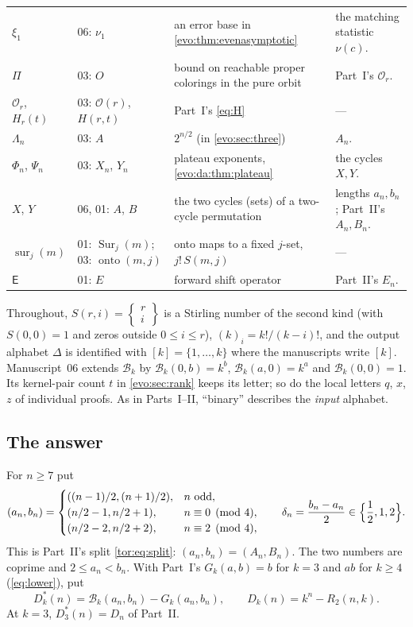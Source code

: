 \documentclass[11pt,a4paper]{article}
\numberwithin{equation}{section}
\theoremstyle{definition}
\theoremstyle{remark}
\newcommand{\D}{\Delta}
\newcommand{\fall}[2]{(#1)_{#2}}
\newcommand{\stirling}[2]{\left\{\!\begin{matrix}#1\\#2\end{matrix}\!\right\}}
\newcommand{\Bip}{\mathcal B}
\newcommand{\sur}{\operatorname{sur}}
\begin{document}
{\begin{longtable}{>{\raggedright}p{.15\linewidth}>{\raggedright}p{.22\linewidth}>{\raggedright}p{.23\linewidth}>{\raggedright\arraybackslash}p{.26\linewidth}}
$\xi_1$ & 06: $\nu_1$ & an error base in \cref{evo:thm:evenasymptotic} & the
 matching statistic $\nu(c)$.\\
$\Pi$ & 03: $O$ & bound on reachable proper colorings in the pure orbit &
 Part~I's $\mathcal O_r$.\\
$\mathcal O_r$, $H_r(t)$ & 03: $\mathcal O(r)$, $H(r,t)$ & Part~I's
 \eqref{eq:H} & ---\\
$\Lambda_n$ & 03: $A$ & $2^{n/2}$ (in \cref{evo:sec:three}) & $A_n$.\\
$\Phi_n$, $\Psi_n$ & 03: $X_n$, $Y_n$ & plateau exponents,
 \cref{evo:da:thm:plateau} & the cycles $X,Y$.\\
$X$, $Y$ & 06, 01: $A$, $B$ & the two cycles (sets) of a two-cycle permutation &
 lengths $a_n,b_n$; Part~II's $A_n,B_n$.\\
$\sur_j(m)$ & 01: $\operatorname{Sur}_j(m)$; 03: $\operatorname{onto}(m,j)$
 & onto maps to a fixed $j$-set, $j!\,S(m,j)$ & ---\\
$\mathsf E$ & 01: $E$ & forward shift operator & Part~II's $E_n$.\\
\end{longtable}}

Throughout, $S(r,i)=\stirling{r}{i}$ is a Stirling number of the second kind
(with $S(0,0)=1$ and zeros outside $0\le i\le r$), $\fall{k}{i}=k!/(k-i)!$, and
the output alphabet $\D$ is identified with $[k]=\{1,\ldots,k\}$ where the
manuscripts write $[k]$. Manuscript~06 extends $\Bip_k$ by
$\Bip_k(0,b)=k^b$, $\Bip_k(a,0)=k^a$ and $\Bip_k(0,0)=1$. Its kernel-pair count
$t$ in \cref{evo:sec:rank} keeps its letter; so do the local letters $q$, $x$,
$z$ of individual proofs. As in Parts~I--II, ``binary'' describes the
\emph{input} alphabet.

\subsection{The answer}\label{evo:sec:answer}

For $n\ge7$ put
\begin{equation}\label{evo:eq:split}
 (a_n,b_n)=
 \begin{cases}
 ((n-1)/2,(n+1)/2),&n\text{ odd},\\
 (n/2-1,n/2+1),&n\equiv0\pmod4,\\
 (n/2-2,n/2+2),&n\equiv2\pmod4,
 \end{cases}
 \qquad
 \delta_n=\frac{b_n-a_n}{2}\in\Bigl\{\frac12,1,2\Bigr\}.
\end{equation}
This is Part~II's split \eqref{tor:eq:split}: $(a_n,b_n)=(A_n,B_n)$. The two
numbers are coprime and $2\le a_n<b_n$. With Part~I's
$G_k(a,b)=b$ for $k=3$ and $ab$ for $k\ge4$ (\eqref{eq:lower}), put
\begin{equation}\label{evo:eq:Dstar}
 D^*_k(n)=\Bip_k(a_n,b_n)-G_k(a_n,b_n),\qquad
 D_k(n)=k^n-R_2(n,k).
\end{equation}
At $k=3$, $D^*_3(n)=D_n$ of Part~II.
\end{document}

